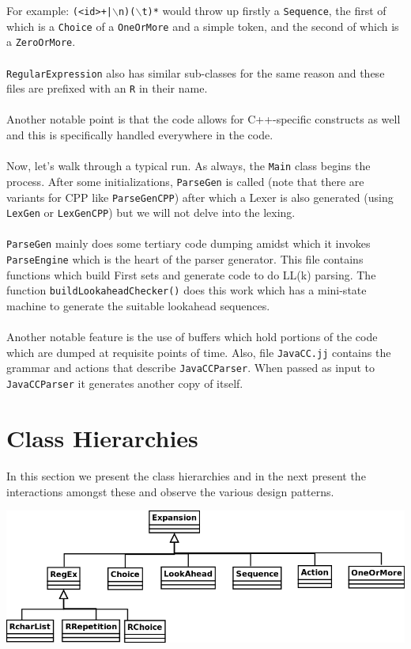 \documentclass[•]{book}
\begin{document}
\noindent For example: \texttt{(<id>+|$\backslash$n)($\backslash$t)*} would throw up firstly a \texttt{Sequence}, the first of which is a \texttt{Choice} of a \texttt{OneOrMore} and a simple token, and the second of which is a \texttt{ZeroOrMore}.\\\\\texttt{RegularExpression} also has similar sub-classes for the same reason and these files are prefixed with an \texttt{R} in their name.\\\\Another notable point is that the code allows for C++-specific constructs as well and this is specifically handled everywhere in the code.\\\\Now, let's walk through a typical run. As always, the \texttt{Main} class begins the process. After some initializations, \texttt{ParseGen} is called (note that there are variants for CPP like \texttt{ParseGenCPP}) after which a Lexer is also generated (using \texttt{LexGen} or \texttt{LexGenCPP}) but we will not delve into the lexing.\\\\\texttt{ParseGen} mainly does some tertiary code dumping amidst which it invokes \texttt{ParseEngine} which is the heart of the parser generator. This file contains functions which build First sets and generate code to do LL(k) parsing. The function \texttt{buildLookaheadChecker()} does this work which has a mini-state machine to generate the suitable lookahead sequences.\\\\Another notable feature is the use of buffers which hold portions of the code which are dumped at requisite points of time. Also, file \texttt{JavaCC.jj} contains the grammar and actions that describe \texttt{JavaCCParser}. When passed as input to \texttt{JavaCCParser} it generates another copy of itself.

\section{Class Hierarchies}
In this section we present the class hierarchies and in the next present the interactions amongst these and observe the various design patterns.
\begin{center}
\includegraphics[scale=0.5]{Expansion.png}
\end{center}
\end{document}
